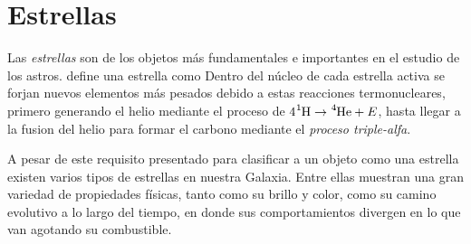 \section{Estrellas}

Las \textit{estrellas} son de los objetos más fundamentales e importantes en el estudio de los astros. \citet*{anIntroStellarAstro::chapter1_basicConcepts} define una estrella como  Dentro del núcleo de cada estrella activa se forjan nuevos elementos más pesados debido a estas reacciones termonucleares, primero generando el helio mediante el proceso de $4 \ce{^1H} \rightarrow \ce{^4He} + E$, hasta llegar a la fusion del helio para formar el carbono mediante el \textit{proceso triple-alfa}.

A pesar de este requisito presentado para clasificar a un objeto como una estrella existen varios tipos de estrellas en nuestra Galaxia. Entre ellas muestran una gran variedad de propiedades físicas, tanto como su brillo y color, como su camino evolutivo a lo largo del tiempo, en donde sus comportamientos divergen en lo que van agotando su combustible.

